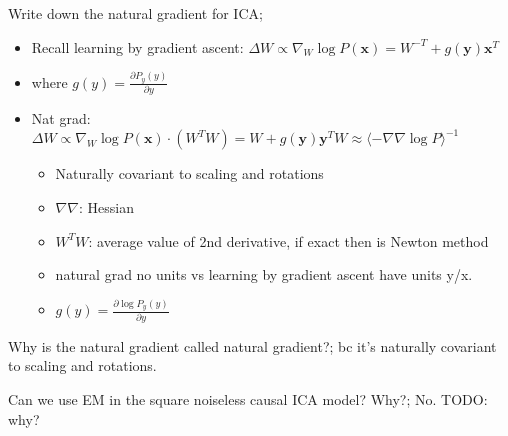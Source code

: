 \documentclass{article}
\begin{document}
Write down the natural gradient for ICA; \begin{itemize} \item Recall learning by gradient ascent: $\Delta W\propto \nabla_W\log P(\mathbf{x}) = W^{-T}+g(\mathbf{y})\mathbf{x}^T$ \item where $g(y) = \frac{\partial P_y(y)}{\partial y}$\item Nat grad: $\Delta W\propto \nabla_W\log P(\mathbf{x})\cdot (W^TW) = W + g(\mathbf{y})\mathbf{y}^TW \approx \langle -\nabla\nabla\log P\rangle^{-1}$ \begin{itemize} \item Naturally covariant to scaling and rotations \item $\nabla\nabla$: Hessian \item $W^TW$: average value of 2nd derivative, if exact then is Newton method \item natural grad no units vs learning by gradient ascent have units y/x. \item $g(y)=\frac{\partial \log P_y(y)}{\partial y}$ \end{itemize} \end{itemize}

Why is the natural gradient called natural gradient?; bc it's naturally covariant to scaling and rotations.


Can we use EM in the square noiseless causal ICA model? Why?; No. TODO: why?
\end{document}
